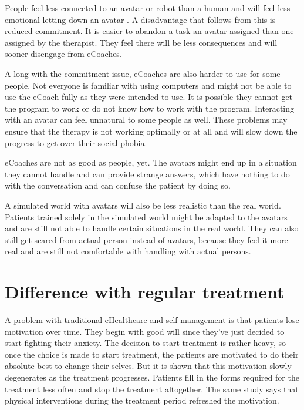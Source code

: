 \documentclass[twoside]{article}
\begin{document}
\begin{multicols}{2}
People feel less connected to an avatar or robot than a human and will feel less emotional letting down an avatar \cite{clutterbuck2009virtual}. A disadvantage that follows from this is reduced commitment. It is easier to abandon a task an avatar assigned than one assigned by the therapist. They feel there will be less consequences and will sooner disengage from eCoaches.

A long with the commitment issue, eCoaches are also harder to use for some people. Not everyone is familiar with using computers and might not be able to use the eCoach fully as they were intended to use. It is possible they cannot get the program to work or do not know how to work with the program. Interacting with an avatar can feel unnatural to some people as well. These problems may ensure that the therapy is not working optimally or at all and will slow down the progress to get over their social phobia.

eCoaches are not as good as people, yet. The avatars might end up in a situation they cannot handle and can provide strange answers, which have nothing to do with the conversation and can confuse the patient by doing so. 

A simulated world with avatars will also be less realistic than the real world. Patients trained solely in the simulated world might be adapted to the avatars and are still not able to handle certain situations in the real world. They can also still get scared from actual person instead of avatars, because they feel it more real and are still not comfortable with handling with actual persons.  


\section{Difference with regular treatment}
A problem with traditional eHealthcare and self-management is that patients lose motivation over time. They begin with good will since they've just decided to start fighting their anxiety. The decision to start treatment is rather heavy, so once the choice is made to start treatment, the patients are motivated to do their absolute best to change their selves. But it is shown \cite{alpay2007} that this motivation slowly degenerates as the treatment progresses. Patients fill in the forms required for the treatment less often and stop the treatment altogether. The same study says that physical interventions during the treatment period refreshed the motivation.


\end{multicols}
\end{document}
